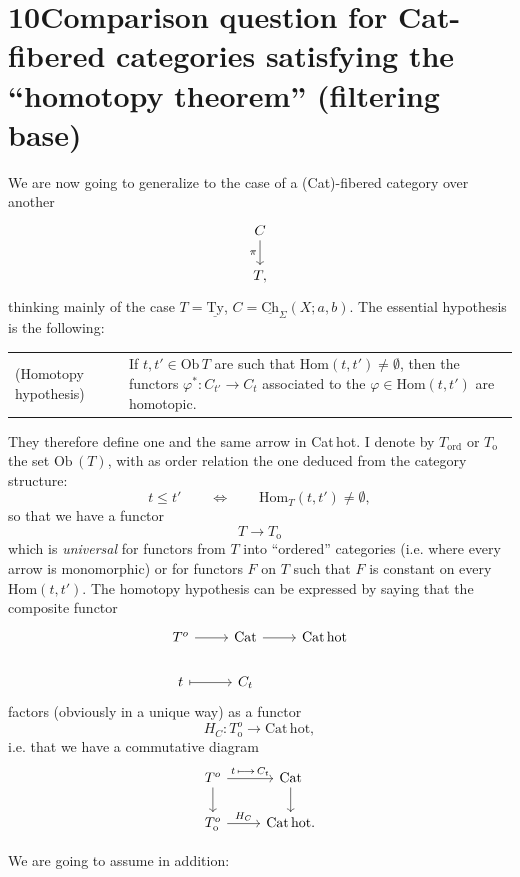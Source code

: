 \documentclass[11pt]{article}
\newcommand{\printedpage}[1]{\marginpar{\footnotesize p.~#1}}
\newcommand{\msp}[1]{\marginpar{\footnotesize [#1]}}
\newcommand{\Cat}{\mathrm{Cat}}
\newcommand{\Cathot}{\mathrm{Cat\,hot}}
\newcommand{\Hom}{\mathrm{Hom}}
\newcommand{\Ob}{\mathrm{Ob}\,}
\newcommand{\uTy}{\underline{\mathrm{Ty}}}
\newcommand{\uCh}{\underline{\mathrm{Ch}}}
\newcommand{\To}{T_{\mathrm{o}}}
\begin{document}
\leavevmode\printedpage{64}
\msp{page 99}

\section*{10\quad Comparison question for \textmd{Cat}-fibered categories satisfying the ``homotopy theorem'' (filtering base)}

We are now going to generalize to the case of a (Cat)-fibered category over another
\[
\begin{tikzcd}
C \arrow[d, "\pi"'] \\
T,
\end{tikzcd}
\]
thinking mainly of the case $T = \uTy$, $C = \uCh_{\Sigma}(X;a,b)$. The essential hypothesis is the following:

\noindent\begin{tabular}{@{}p{}p{}@{}}
(Homotopy hypothesis) & If $t,t' \in \Ob T$ are such that $\Hom(t,t') \neq \emptyset$, then the functors $\varphi^{*} : C_{t'} \longrightarrow C_{t}$ associated to the $\varphi \in \Hom(t,t')$ are homotopic.
\end{tabular}

They therefore define one and the same arrow in Cat\,hot. I denote by $T_{\mathrm{ord}}$ or $\To$ the set $\Ob(T)$, with as order relation the one deduced from the category structure:
\[
t \leq t' \qquad\Longleftrightarrow\qquad \Hom_{T}(t,t') \neq \emptyset,
\]
so that we have a functor
\[
T \longrightarrow \To
\]
which is \textit{universal} for functors from $T$ into ``ordered'' categories (i.e. where every arrow is monomorphic) or for functors $F$ on $T$ such that $F$ is constant on every $\Hom(t,t')$. The homotopy hypothesis can be expressed by saying that the composite functor
\[
\begin{tikzcd}
T^{o} \arrow[r] & \Cat \arrow[r] & \Cathot \\
t \arrow[r, mapsto] & C_{t} &
\end{tikzcd}
\]
\msp{page 100}
factors (obviously in a unique way) as a functor
\[
H_{C} : \To^{o} \longrightarrow \Cathot,
\]
i.e. that we have a commutative diagram
\printedpage{65}
\[
\begin{tikzcd}
T^{o} \arrow[r, "t\,\longmapsto\, C_{t}"] \arrow[d] & \Cat \arrow[d] \\
\To^{o} \arrow[r, "H_{C}"] & \Cathot.
\end{tikzcd}
\]

We are going to assume in addition:
\end{document}
